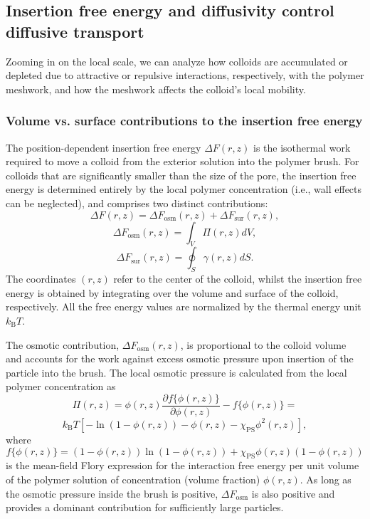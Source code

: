 \documentclass[12pt, a4paper]{article}
\begin{document}
\subsection{Insertion free energy and diffusivity control diffusive transport}

Zooming in on the local scale, we can analyze how colloids are accumulated or depleted due to attractive or repulsive interactions, respectively, with the polymer meshwork, and how the meshwork affects the colloid's local mobility.


\subsubsection{Volume vs. surface contributions to the insertion free energy}

The position-dependent insertion free energy $\Delta F(r,z)$ is the isothermal work required to move a colloid from the exterior solution into the polymer brush.
For colloids that are significantly smaller than the size of the pore, the insertion free energy is determined entirely by the local polymer concentration (i.e., wall effects can be neglected), and comprises two distinct contributions:
\begin{equation}
    \Delta F (r,z)= \Delta F_{\text{osm}}(r,z) + \Delta F_{\text{sur}}(r,z),
    \label{eq:Delta_F}
\end{equation}
$$
\Delta F_{\text{osm}}(r,z) = \int_{V} \Pi(r,z) dV,
$$
$$
\Delta F_{\text{sur}}(r,z) = \oint_{S} \gamma (r,z) dS.
$$
The coordinates $(r,z)$ refer to the center of the colloid, whilst the insertion free energy is obtained by integrating over the volume and surface of the colloid, respectively. All the free energy values are normalized by the thermal energy unit $k_{\text{B}}T$.

The osmotic contribution, $\Delta F_{\text{osm}}(r,z)$, is proportional to the colloid volume and accounts for the work against excess osmotic pressure upon insertion of the particle into the brush.
The local osmotic pressure is calculated from the local polymer concentration as
$$
\Pi(r,z)=  \phi(r,z)\frac{\partial f\{\phi(r,z)\}}{\partial \phi(r,z)} - f\{\phi(r,z)\}= 
$$
\begin{equation}
	k_{\text{B}}T[-\ln(1-\phi(r,z)) - \phi(r,z) -\chi_{\text{PS}}\phi^2(r,z)],
\end{equation}
where
$$
f\{\phi(r,z)\}=(1-\phi(r,z))\ln(1-\phi(r,z)) +\chi_{\text{PS}}\phi(r,z)(1-\phi(r,z))
$$
is the mean-field Flory expression for the interaction free energy per unit volume of the polymer solution of concentration (volume fraction) $\phi(r,z)$.
As long as the osmotic pressure inside the brush is positive, $\Delta F_{\text{osm}}$ is also positive and provides a dominant contribution for sufficiently large particles.
\end{document}
